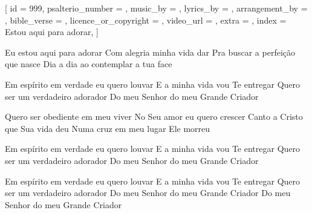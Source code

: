 
[
    id                     = {999},
    psalterio_number       = {},
    music_by               = {},
    lyrics_by              = {},
    arrangement_by         = {},
    bible_verse            = {},
    licence_or_copyright   = {},
    video_url              = {},
    extra                  = {},
    index                  = {Estou aqui para adorar},
]


\beginverse
Eu estou aqui para adorar
Com alegria minha vida dar
Pra buscar a perfeição que nasce
Dia a dia ao contemplar a tua face
\endverse

\beginchorus
Em espírito em verdade eu quero louvar
E a minha vida vou Te entregar
Quero ser um verdadeiro adorador
Do meu Senhor do meu Grande Criador
\endchorus

\beginverse
Quero ser obediente em meu viver
No Seu amor eu quero crescer
Canto a Cristo que Sua vida deu
Numa cruz em meu lugar Ele morreu
\endverse

\beginchorus
Em espírito em verdade eu quero louvar
E a minha vida vou Te entregar
Quero ser um verdadeiro adorador
Do meu Senhor do meu Grande Criador
\endchorus


\beginchorus
Em espírito em verdade eu quero louvar
E a minha vida vou Te entregar
Quero ser um verdadeiro adorador
Do meu Senhor do meu Grande Criador
Do meu Senhor do meu Grande Criador
\endchorus

\endsong
